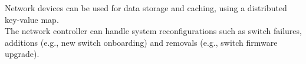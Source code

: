 Network devices can be used for data storage and caching, using a distributed key-value map.\\
The network controller can handle system reconfigurations such as switch failures, additions (e.g., new switch onboarding) and removals (e.g., switch firmware upgrade).